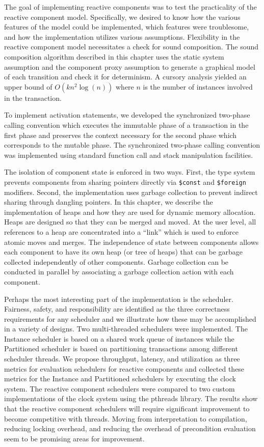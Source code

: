 The goal of implementing reactive components was to test the practicality of the reactive component model.
Specifically, we desired to know how the various features of the model could be implemented, which features were troublesome, and how the implementation utilizes various assumptions.
Flexibility in the reactive component model necessitates a check for sound composition.
The sound composition algorithm described in this chapter uses the static system assumption and the component proxy assumption to generate a graphical model of each transition and check it for determinism.
A cursory analysis yielded an upper bound of $O(k n^2 \log (n))$ where $n$ is the number of instances involved in the transaction.

To implement activation statements, we developed the synchronized two-phase calling convention which executes the immutable phase of a transaction in the first phase and preserves the context necessary for the second phase which corresponds to the mutable phase.
The synchronized two-phase calling convention was implemented using standard function call and stack manipulation facilities.

The isolation of component state is enforced in two ways.
First, the type system prevents components from sharing pointers directly via \verb+$const+ and \verb+$foreign+ modifiers.
Second, the implementation uses garbage collection to prevent indirect sharing through dangling pointers.
In this chapter, we describe the implementation of heaps and how they are used for dynamic memory allocation.
Heaps are designed so that they can be merged and moved.
At the user level, all references to a heap are concentrated into a ``link'' which is used to enforce atomic moves and merges.
The independence of state between components allows each component to have its own heap (or tree of heaps) that can be garbage collected independently of other components.
Garbage collection can be conducted in parallel by associating a garbage collection action with each component.

Perhaps the most interesting part of the implementation is the scheduler.
Fairness, safety, and responsibility are identified as the three correctness requirements for any scheduler and we illustrate how these may be accomplished in a variety of designs.
Two multi-threaded schedulers were implemented.
The Instance scheduler is based on a shared work queue of instances while the Partitioned scheduler is based on partitioning transactions among different scheduler threads.
We propose throughput, latency, and utilization as three metrics for evaluation schedulers for reactive components and collected these metrics for the Instance and Partitioned schedulers by executing the clock system.
The reactive component schedulers were compared to two custom implementations of the clock system using the pthreads library.
The results show that the reactive component schedulers will require significant improvement to become competitive with threads.
Moving from interpretation to compilation, reducing locking overhead, and reducing the overhead of precondition evaluation seem to be promising areas for improvement.

